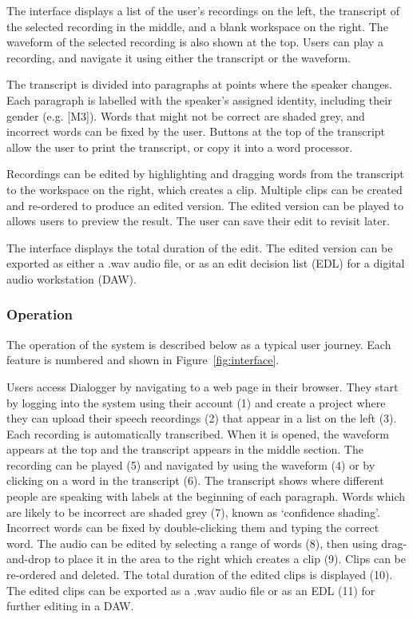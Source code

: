 The interface displays a list of the user's recordings on the left, the
transcript of the selected recording in the middle, and a blank workspace on the
right. The waveform of the selected recording is also shown at the top.
Users can play a recording, and navigate it using either the transcript or the waveform.

The transcript is divided into paragraphs at points where the speaker
changes. Each paragraph is labelled with the speaker's assigned identity, including
their gender (e.g. [M3]). Words that might not be correct are shaded grey, and
incorrect words can be fixed by the user. Buttons at the top of the transcript
allow the user to print the transcript, or copy it into a word processor.

Recordings can be edited by highlighting and dragging words from the
transcript to the workspace on the right, which creates a clip. Multiple clips
can be created and re-ordered to produce an edited version. The edited version
can be played to allows users to preview the result. The user can save their
edit to revisit later.

The interface displays the total duration of the edit. The edited version can
be exported as either a .wav audio file, or as an edit decision list (EDL) for
a digital audio workstation (DAW).

\subsubsection{Operation}
The operation of the system is described below as a typical user journey. Each
feature is numbered and shown in Figure~\ref{fig:interface}.

Users access Dialogger by navigating to a web page in their browser. They start
by logging into the system using their account (1) and create a project where
they can upload their speech recordings (2) that appear in a list on the left
(3). Each recording is automatically transcribed. When it is opened, the
waveform appears at the top and the transcript appears in the middle section.
The recording can be played (5) and navigated by using the waveform (4) or by
clicking on a word in the transcript (6). The transcript shows where different
people are speaking with labels at the beginning of each paragraph. Words which
are likely to be incorrect are shaded grey (7), known as `confidence shading'.
Incorrect words can be fixed by double-clicking them and typing the correct
word. The audio can be edited by selecting a range of words (8), then using
drag-and-drop to place it in the area to the right which creates a clip (9).
Clips can be re-ordered and deleted. The total duration of the edited clips is
displayed (10). The edited clips can be exported as a .wav audio file or as an
EDL (11) for further editing in a DAW.

